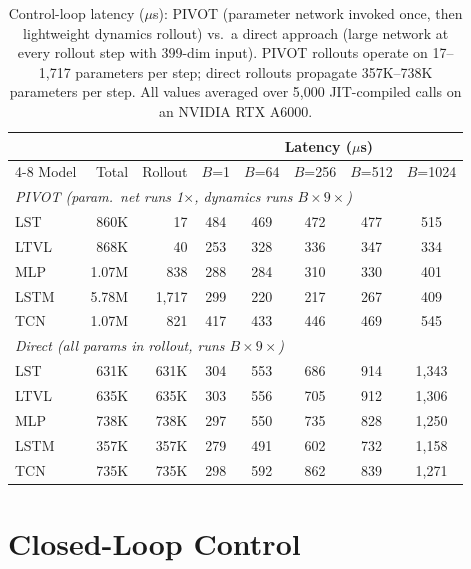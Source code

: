 \begin{table}[t]
\centering
\caption{Control-loop latency ($\mu$s): PIVOT (parameter network invoked once, then lightweight dynamics rollout) vs.\ a direct approach (large network at every rollout step with 399-dim input). PIVOT rollouts operate on 17--1,717 parameters per step; direct rollouts propagate 357K--738K parameters per step. All values averaged over 5,000 JIT-compiled calls on an NVIDIA RTX A6000.}
\label{tab:latency}
\small
\begin{tabular}{@{}lrrccccc@{}}
\toprule
 & & & \multicolumn{5}{c}{Latency ($\mu$s)} \\
\cmidrule(l){4-8}
Model & Total & Rollout & $B$=1 & $B$=64 & $B$=256 & $B$=512 & $B$=1024 \\
\midrule
\multicolumn{8}{l}{\textit{PIVOT (param.\ net runs 1$\times$, dynamics runs $B \times 9\times$)}} \\
LST & 860K & 17 & 484 & 469 & 472 & 477 & 515 \\
LTVL & 868K & 40 & 253 & 328 & 336 & 347 & 334 \\
MLP & 1.07M & 838 & 288 & 284 & 310 & 330 & 401 \\
LSTM & 5.78M & 1,717 & 299 & 220 & 217 & 267 & 409 \\
TCN & 1.07M & 821 & 417 & 433 & 446 & 469 & 545 \\
\midrule
\multicolumn{8}{l}{\textit{Direct (all params in rollout, runs $B \times 9\times$)}} \\
LST & 631K & 631K & 304 & 553 & 686 & 914 & 1,343 \\
LTVL & 635K & 635K & 303 & 556 & 705 & 912 & 1,306 \\
MLP & 738K & 738K & 297 & 550 & 735 & 828 & 1,250 \\
LSTM & 357K & 357K & 279 & 491 & 602 & 732 & 1,158 \\
TCN & 735K & 735K & 298 & 592 & 862 & 839 & 1,271 \\
\bottomrule
\end{tabular}
\end{table}

\section{Closed-Loop Control}
\label{sec:closedloop}
